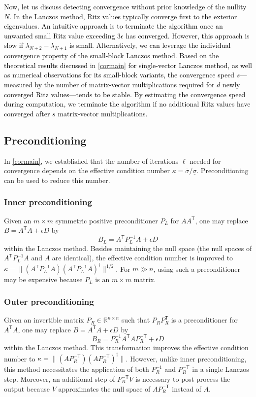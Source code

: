 \documentclass{siamart190516}
\newcommand{\Ttran}{\mathsf{T}}
\newcommand{\R}{\mathbb{R}}
\providecommand{\norm}[1]{\lVert#1\rVert}
\newcommand{\edit}[1]{\textcolor{black}{#1}} %
\begin{document}
\edit{Now, let us discuss detecting convergence without prior knowledge of the nullity~$N$. 
In the Lanczos method, Ritz values typically converge first to the exterior eigenvalues.
An intuitive approach is to terminate the algorithm once an unwanted small Ritz value exceeding $3\epsilon$ has converged. However, this approach is slow if $\lambda_{N+2} - \lambda_{N+1}$ is small. Alternatively, we can leverage the individual convergence property of the small-block Lanczos method.
Based on the theoretical results discussed in \cref{cormain} for single-vector Lanczos method, as well as numerical observations for its small-block variants, the convergence speed $s$---measured by the number of matrix-vector multiplications required for $d$ newly converged Ritz values---tends to be stable.
By estimating the convergence speed during computation, we terminate the algorithm if no additional Ritz values have converged after $s$ matrix-vector multiplications.}


\subsection{Preconditioning}

In \cref{cormain}, we established that the number of iterations $\ell$ needed for convergence depends on the effective condition number $\kappa=\overline{\sigma}/\underline{\sigma}$. Preconditioning can be used to reduce this number.


\subsubsection{Inner preconditioning}
Given an $m\times m$ symmetric positive preconditioner $P_{L}$ for $A A^{\Ttran}$, one may replace $B=A^{\Ttran}A+\epsilon D$ by \[ B_{L}=A^{\Ttran}P_{L}^{-1}A+\epsilon D \] within the Lanczos method. Besides maintaining the null space (the null spaces of $A^{\Ttran}P_{L}^{-1}A$ and $A$ are identical), the effective condition number is improved to $\kappa = \norm{(A^{\Ttran}P_{L}^{-1}A)(A^{\Ttran}P_{L}^{-1}A)^{\dagger}}^{1/2}$. For $m\gg n$, using such a preconditioner may be expensive because  $P_{L}$ is an $m \times m$ matrix.

\subsubsection{Outer preconditioning} \label{sec:outerprecond}
Given an invertible matrix  $P_{R}\in\R^{n\times n}$ such that $P_{R}P_{R}^{\Ttran}$ is a preconditioner for $A^{\Ttran} A$, one may replace $B=A^{\Ttran}A+\epsilon D$ by \[B_{R}=P_{R}^{-1}A^{\Ttran}AP_{R}^{-\Ttran}+\epsilon D \] within the Lanczos method. This transformation improves the effective condition number to $\kappa = \norm{(AP_{R}^{-\Ttran})(AP_{R}^{-\Ttran})^{\dagger}}$. However, unlike inner preconditioning, this method necessitates the application of both $P_{R}^{-1}$ and $P_{R}^{-\Ttran}$ in a single Lanczos step. Moreover, an additional step of $P_{R}^{-\Ttran}V$ is necessary to post-process the output because $V$ approximates the null space of $AP_{R}^{-\Ttran}$ instead of $A$.
\end{document}
